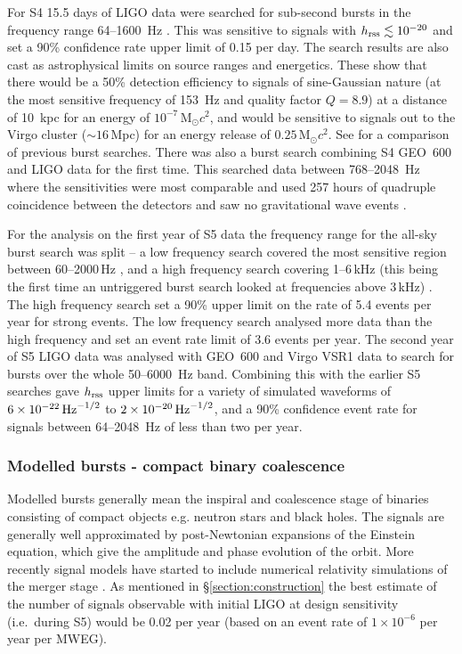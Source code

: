 \documentclass{article}
\begin{document}
For S4 15.5 days of LIGO data were searched for sub-second bursts
in the frequency range 64--1600~Hz \cite{Abbott:2007b}. This was sensitive to
signals with $h_{\rm rss}\lesssim10^{-20}$ and set a 90\% confidence rate
upper limit of 0.15 per day. The search results are also cast as astrophysical
limits on source ranges and energetics. These show that there would be a 50\%
detection efficiency to signals of sine-Gaussian nature (at the most sensitive 
frequency of 153~Hz and quality factor $Q=8.9$) at a distance of 10~kpc for an
energy of $10^{-7}$\,M$_{\odot}c^2$, and would be sensitive to signals out to
the Virgo cluster ($\sim16$\,Mpc) for an energy release of
$0.25$\,M$_{\odot}c^2$. See \cite{Abbott:2007b} for a comparison of previous
burst searches. There was also a burst search combining S4 GEO~600 and LIGO data
for the first time. This searched data between 768--2048~Hz where the
sensitivities were most comparable and used 257 hours of quadruple coincidence
between the detectors and saw no gravitational wave events \cite{Abbott:2008b}.

For the analysis on the first year of S5 data the frequency range for the
all-sky burst search was split -- a low frequency search covered the most
sensitive region between 60--2000\,Hz \cite{Abbott:2009h}, and a high frequency
search covering 1--6\,kHz (this being the first time an
untriggered burst search looked at frequencies above 3\,kHz)
\cite{Abbott:2009i}. The high frequency search
set a 90\% upper limit on the rate of 5.4 events per year for strong events. The
low frequency search analysed more data than the high frequency and set an
event rate limit of 3.6 events per year. The second year of S5 LIGO data was
analysed with GEO~600 and Virgo VSR1 data \cite{Abadie:2010d} to search for 
bursts over the whole 50--6000~Hz band. Combining this with the earlier S5 
searches gave $h_{\rm rss}$ upper limits for a variety of simulated waveforms 
of $6\times10^{-22}\,{\rm Hz}^{-1/2}$ to $2\times10^{-20}\,{\rm Hz}^{-1/2}$, and a
90\% confidence event rate for signals between 64--2048~Hz of less than two 
per year.

\subsubsection{Modelled bursts - compact binary coalescence}\label{sec:cbc}
Modelled bursts generally mean the inspiral and coalescence stage of binaries
consisting of compact objects e.g. neutron stars and black holes. The signals
are generally well approximated by post-Newtonian expansions of the Einstein
equation, which give the amplitude and phase evolution of the orbit. More recently signal
models have started to include numerical relativity simulations of the
merger stage \cite{Aylott:2009}. As mentioned in \S\ref{section:construction} 
the best estimate of the number of signals observable with initial LIGO at design sensitivity 
(i.e.~during S5) would be 0.02 per year (based on an event rate of 
$1\times10^{-6}$ per year per MWEG). 
\end{document}
